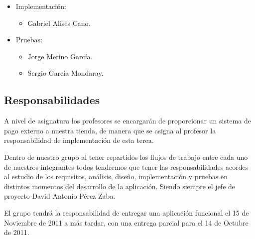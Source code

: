 \begin{enumerate}
\begin{itemize}
  \item Implementación:
    \begin{itemize}
    \item Gabriel Alises Cano.
    \end{itemize}

  \item Pruebas:
    \begin{itemize}
    \item Jorge Merino García.
    \item Sergio García Mondaray.
    \end{itemize}

  \end{itemize}
\end{enumerate}


\subsection{Responsabilidades}
A nivel de asignatura los profesores se encargarán de proporcionar un sistema de pago externo a nuestra tienda, de manera que se asigna al profesor la responsabilidad de implementación de esta terea.

Dentro de nuestro grupo al tener repartidos los flujos de trabajo entre cada uno de nuestros integrantes todos tendremos que tener las responsabilidades acordes al estudio de los requisitos, análisis, diseño, implementación y pruebas en distintos momentos del desarrollo de la aplicación. Siendo siempre el jefe de proyecto David Antonio Pérez Zaba.

El grupo tendrá la responsabilidad de entregar una aplicación funcional el 15 de Noviembre de 2011 a más tardar, con una entrega parcial para el 14 de Octubre de 2011.

